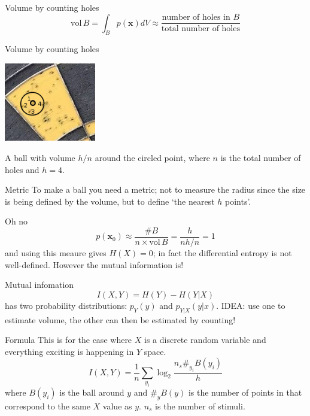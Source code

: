 \documentclass{beamer}
\begin{document}
\begin{frame}{Volume by counting holes}
\color{dark}
$$\mbox{vol}\,B=\int_B p(\mathbf{x}) dV\approx \frac{\mbox{number of holes in }B}{\mbox{total number of holes}}$$
\end{frame}

\begin{frame}{Volume by counting holes}
\color{reddish}
\begin{center}
\includegraphics[width=4cm]{dart_board_zoom_ball.png}
\end{center}
\color{black}
A ball with volume $h/n$ around the circled point, where $n$ is the total number of holes and $h=4$.
\end{frame}


\begin{frame}{Metric}
To make a ball you need a metric; not to measure the radius since the
size is being defined by the volume, but to define \lq{}the nearest
$h$ points\rq{}.
\color{reddish}
\begin{center}
\color{reddish}

\end{center}
\end{frame}


\begin{frame}{Oh no}
\color{dark}
$$p(\mathbf{x}_0)\approx\frac{\#B}{n\times \mbox{vol}\,B}=\frac{h}{nh/n}=1$$
\color{black}
and using this meaure gives $H(X)=0$; in fact the
  differential entropy is not well-defined. However the
  mutual information is!
\end{frame}


\begin{frame}{Mutual infomation}
\color{dark}
$$I(X,Y)=H(Y)-H(Y|X)$$ 
\color{black}
has two probability distributions: $p_Y(y)$ and
  $p_{Y|X}(y|x)$.
\vskip 1cm
IDEA: use one to estimate volume, the other can then
  be estimated by counting!
\end{frame}

\begin{frame}{Formula}
This is for the case where $X$ is a discrete random variable and
everything exciting is happening in $Y$ space.
\color{dark}
$$I(X,Y)=\frac{1}{n}\sum_{y_i}\log_2{\frac{n_s\#_{y_i}B(y_i)}{h}}$$
\color{black} where $B(y_i)$ is the ball around $y$ and $\#_y{B(y)}$
  is the number of points in that correspond to the same $X$ value as
  $y$. $n_s$ is the number of stimuli.
\end{frame}
\end{document}
